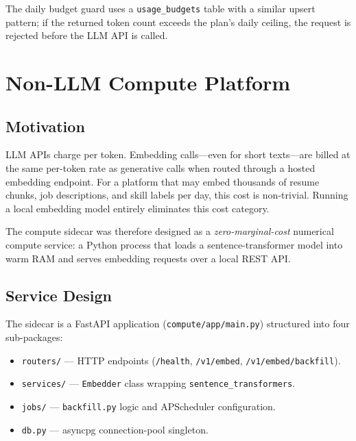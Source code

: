 \documentclass[conference]{IEEEtran}
\begin{document}
The daily budget guard uses a \texttt{usage\_budgets} table with a similar
upsert pattern; if the returned token count exceeds the plan's daily ceiling,
the request is rejected before the LLM API is called.

\section{Non-LLM Compute Platform}
\label{sec:compute}

\subsection{Motivation}

LLM APIs charge per token. Embedding calls---even for short texts---are
billed at the same per-token rate as generative calls when routed through
a hosted embedding endpoint. For a platform that may embed thousands of
resume chunks, job descriptions, and skill labels per day, this cost is
non-trivial. Running a local embedding model entirely eliminates this cost
category.

The compute sidecar was therefore designed as a \emph{zero-marginal-cost}
numerical compute service: a Python process that loads a sentence-transformer
model into warm RAM and serves embedding requests over a local REST API.

\subsection{Service Design}

The sidecar is a FastAPI application (\texttt{compute/app/main.py}) structured
into four sub-packages:

\begin{itemize}
  \item \texttt{routers/} --- HTTP endpoints (\texttt{/health}, \texttt{/v1/embed},
        \texttt{/v1/embed/backfill}).
  \item \texttt{services/} --- \texttt{Embedder} class wrapping
        \texttt{sentence\_transformers}.
  \item \texttt{jobs/} --- \texttt{backfill.py} logic and APScheduler
        configuration.
  \item \texttt{db.py} --- asyncpg connection-pool singleton.
\end{itemize}
\end{document}
